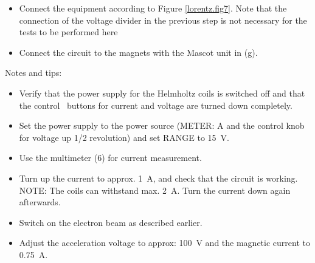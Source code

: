 \documentclass[../Elmag-labhefte-2020.tex]{subfiles}
\begin{document}
\begin{itemize}
\item Connect the equipment according to Figure \ref{lorentz.fig7}. Note that the connection of the voltage divider in the previous step is not necessary for the tests to be performed here
\item Connect the circuit to the magnets with the Mascot unit in (g).
\end{itemize}

Notes and tips:
\begin{itemize}
    \item Verify that the power supply for the Helmholtz coils is switched off and that the control \ buttons for current and voltage are turned down completely.
    \item Set the power supply to the power source (METER: A and the control knob for voltage up 1/2 revolution) and set RANGE to \SI{15}{\volt}.
    \item Use the multimeter (6) for current measurement.
    \item Turn up the current to approx. \SI{1}{\ampere}, and check that the circuit is working. NOTE: The coils can withstand max. \SI{2}{\ampere}. Turn the current down again afterwards.
    \item Switch on the electron beam as described earlier.
    \item Adjust the acceleration voltage to approx: \SI{100}{\volt} and the magnetic current to \SI{0.75}{\ampere}.
\end{itemize}
\end{document}
